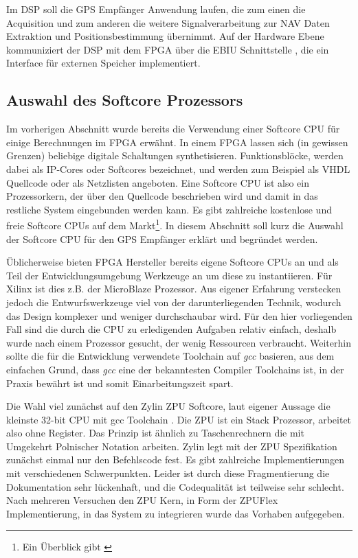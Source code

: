 Im DSP soll die GPS Empfänger Anwendung laufen, die zum einen die Acquisition und zum anderen die weitere Signalverarbeitung zur NAV Daten Extraktion und Positionsbestimmung übernimmt. Auf der Hardware Ebene kommuniziert der DSP mit dem FPGA über die \gls{EBIU} Schnittstelle \cite{BlackfinHWReference}, die ein Interface für externen Speicher implementiert. 


\subsection{Auswahl des Softcore Prozessors}
Im vorherigen Abschnitt wurde bereits die Verwendung einer Softcore CPU für einige Berechnungen im FPGA erwähnt. In einem FPGA lassen sich (in gewissen Grenzen) beliebige digitale Schaltungen synthetisieren. Funktionsblöcke, werden dabei als IP-Cores oder Softcores bezeichnet, und werden zum Beispiel als VHDL Quellcode oder als Netzlisten angeboten. Eine Softcore CPU ist also ein Prozessorkern, der über den Quellcode beschrieben wird und damit in das restliche System eingebunden werden kann. Es gibt zahlreiche kostenlose und freie Softcore CPUs auf dem Markt\footnote{Ein Überblick gibt \cite{SoftcoreOverview}}. In diesem Abschnitt soll kurz die Auswahl der Softcore CPU für den GPS Empfänger erklärt und begründet werden. 

Üblicherweise bieten FPGA Hersteller bereits eigene Softcore CPUs an und als Teil der Entwicklungsumgebung Werkzeuge an um diese zu instantiieren. Für Xilinx ist dies z.B. der MicroBlaze Prozessor. Aus eigener Erfahrung verstecken jedoch die Entwurfswerkzeuge viel von der darunterliegenden Technik, wodurch das Design komplexer und weniger durchschaubar wird. Für den hier vorliegenden Fall sind die durch die CPU zu erledigenden Aufgaben relativ einfach, deshalb wurde nach einem Prozessor gesucht, der wenig Ressourcen verbraucht. Weiterhin sollte die für die Entwicklung verwendete Toolchain auf \emph{gcc} basieren, aus dem einfachen Grund, dass \emph{gcc} eine der bekanntesten Compiler Toolchains ist, in der Praxis bewährt ist und somit Einarbeitungszeit spart.

Die Wahl viel zunächst auf den Zylin ZPU Softcore, laut eigener Aussage die kleinste 32-bit CPU mit gcc Toolchain \cite{ZPUgithub}. Die ZPU ist ein Stack Prozessor, arbeitet also ohne Register. Das Prinzip ist ähnlich zu Taschenrechnern die mit Umgekehrt Polnischer Notation arbeiten. Zylin legt mit der ZPU Spezifikation zunächst einmal nur den Befehlscode fest. Es gibt zahlreiche Implementierungen mit verschiedenen Schwerpunkten. Leider ist durch diese Fragmentierung die Dokumentation sehr lückenhaft, und die Codequalität ist teilweise sehr schlecht. Nach mehreren Versuchen den ZPU Kern, in Form der ZPUFlex Implementierung, in das System zu integrieren wurde das Vorhaben aufgegeben.

